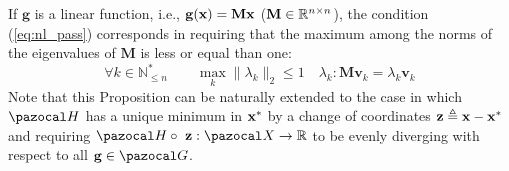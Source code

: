 %
If $\mathbf{g}$ is a linear function, i.e., $\mathbf{g}(\mathbf{x}) = \mathbf{M}\mathbf{x}$ ($\mathbf{M}\in\mathbb{R}^{n\times n}$), the condition (\ref{eq:nl_pass}) corresponds in requiring that the maximum among the norms of the eigenvalues of $\mathbf{M}$ is less or equal than one:
%
\begin{equation}
	\forall k \in\mathbb{N}^*_{\leq n} \qquad \max\limits_{k}\|\lambda_k\|_2\leq 1\quad\lambda_k:\mathbf{M}\mathbf{v}_k = \lambda_k\mathbf{v}_k
\end{equation}
%
Note that this Proposition can be naturally extended to the case in which $\Ha$ has a unique minimum in $\mathbf{x}^*$ by a change of coordinates $\mathbf{z}\triangleq \mathbf{x}-\mathbf{x}^*$ and requiring $\Ha \circ~\zb:\X\rightarrow\R$ to be evenly diverging with respect to all $\gb\in\G$.
%
\newline


